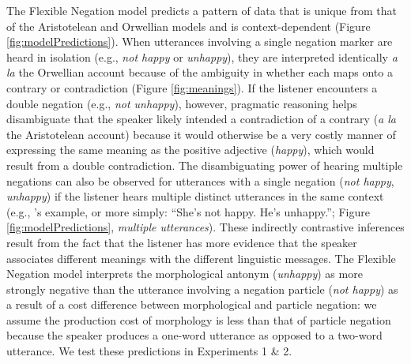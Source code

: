 \documentclass[floatsintext,doc]{apa6}
\let\rmarkdownfootnote\footnote%
\def\footnote{\protect\rmarkdownfootnote}
\newcommand{\ourmodel}{Flexible Negation\xspace}
\begin{document}
The \ourmodel model predicts a pattern of data that is unique from that of the Aristotelean and Orwellian models and is context-dependent (Figure \ref{fig:modelPredictions}).
When utterances involving a single negation marker are heard in isolation (e.g., \emph{not happy} or \emph{unhappy}), they are interpreted identically \emph{a la} the Orwellian account because of the ambiguity in whether each maps onto a contrary or contradiction (Figure \ref{fig:meanings}).  
If the listener encounters a double negation (e.g., \emph{not unhappy}), however, pragmatic reasoning helps disambiguate that the speaker likely intended a contradiction of a contrary (\emph{a la} the Aristotelean account) because it would otherwise be a very costly manner of expressing the same meaning as the positive adjective (\emph{happy}), which would result from a double contradiction.
The disambiguating power of hearing multiple negations can also be observed for utterances with a single negation (\emph{not happy}, \emph{unhappy}) if the listener hears multiple distinct utterances in the same context (e.g., 's example, or more simply: ``She's not happy. He's unhappy.''; Figure \ref{fig:modelPredictions}, \emph{multiple utterances}). These indirectly contrastive inferences result from the fact that the listener has more evidence that the speaker associates different meanings with the different linguistic messages.
The \ourmodel model interprets the morphological antonym (\emph{unhappy}) as more strongly negative than the utterance involving a negation particle (\emph{not happy})  as a result of a cost difference between morphological and particle negation: we assume the production cost of morphology is less than that of particle negation because the speaker produces a one-word utterance as opposed to a two-word utterance.
We test these predictions in Experiments 1 \& 2.

%

\end{document}
